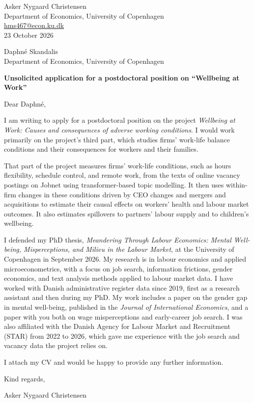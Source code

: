 \documentclass[11pt,a4paper]{article}
\begin{document}
\begin{flushright}
Asker Nygaard Christensen \\
Department of Economics, University of Copenhagen \\
\href{mailto:hms467@econ.ku.dk}{hms467@econ.ku.dk} \\[8pt]
23 October 2026
\end{flushright}

Daphné Skandalis \\
Department of Economics, University of Copenhagen

\textbf{Unsolicited application for a postdoctoral position on ``Wellbeing at Work''}

Dear Daphné,

I am writing to apply for a postdoctoral position on the project \textit{Wellbeing at Work: Causes and consequences of adverse working conditions}. I would work primarily on the project's third part, which studies firms' work-life balance conditions and their consequences for workers and their families.

That part of the project measures firms' work-life conditions, such as hours flexibility, schedule control, and remote work, from the texts of online vacancy postings on Jobnet using transformer-based topic modelling. It then uses within-firm changes in these conditions driven by CEO changes and mergers and acquisitions to estimate their causal effects on workers' health and labour market outcomes. It also estimates spillovers to partners' labour supply and to children's wellbeing.

I defended my PhD thesis, \textit{Meandering Through Labour Economics: Mental Well-being, Misperceptions, and Milieu in the Labour Market}, at the University of Copenhagen in September 2026. My research is in labour economics and applied microeconometrics, with a focus on job search, information frictions, gender economics, and text analysis methods applied to labour market data. I have worked with Danish administrative register data since 2019, first as a research assistant and then during my PhD. My work includes a paper on the gender gap in mental well-being, published in the \textit{Journal of International Economics}, and a paper with you both on wage misperceptions and early-career job search. I was also affiliated with the Danish Agency for Labour Market and Recruitment (STAR) from 2022 to 2026, which gave me experience with the job search and vacancy data the project relies on.

I attach my CV and would be happy to provide any further information.

Kind regards,

Asker Nygaard Christensen
\end{document}
